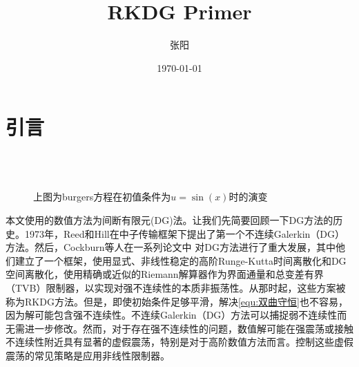 \documentclass{article}
\title{RKDG Primer}
\author{张阳}
\date{\today}
\numberwithin{equation}{subsection}    %
\begin{document}
\maketitle
\tableofcontents
\newpage
\section{引言}

\begin{figure}[ht]%
    \centering
    \quad
    \\
    \quad
    \\
    \caption{上图为burgers方程在初值条件为$u=\sin(x)$时的演变}
    \label{间断示例}
\end{figure}


本文使用的数值方法为间断有限元(DG)法。让我们先简要回顾一下DG方法的历史。1973年，Reed和Hill\cite{Reed_Hill}在中子传输框架下提出了第一个不连续Galerkin（DG）方法。然后，Cockburn等人在一系列论文中 \cite{RKDG2,RKDG3,RKDG4,RKDG5} 对DG方法进行了重大发展，其中他们建立了一个框架，使用显式、非线性稳定的高阶Runge-Kutta时间离散化和DG空间离散化，使用精确或近似的Riemann解算器作为界面通量和总变差有界（TVB）限制器\cite{TVB}，以实现对强不连续性的本质非振荡性。从那时起，这些方案被称为RKDG方法。但是，即使初始条件足够平滑，解决\eqref{equ:双曲守恒}也不容易，因为解可能包含强不连续性。不连续Galerkin（DG）方法可以捕捉弱不连续性而无需进一步修改。然而，对于存在强不连续性的问题，数值解可能在强震荡或接触不连续性附近具有显著的虚假震荡，特别是对于高阶数值方法而言。控制这些虚假震荡的常见策略是应用非线性限制器。
\end{document}
